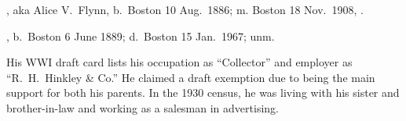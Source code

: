 \begin{Kids}
	, aka Alice V.\ Flynn, b.\ Boston 10 Aug.\ 1886; m. Boston 18 Nov.\ 1908, .
	
	, b.\ Boston 6 June 1889;\cite{Harry4FlynnBirth} d.\ Boston 15 Jan.\ 1967;\cite{Harry4FlynnDeath} unm.
	
	\begin{KidsMoreText}
		His WWI draft card lists his occupation as ``Collector'' and employer as ``R.\ H.\ Hinkley \& Co.'' He claimed a draft exemption due to being the main support for both his parents.\cite{Harry4FlynnDraft} In the 1930 census, he was living with his sister and brother-in-law and working as a salesman in advertising.\cite{Census1930HarryFlynn}
	\end{KidsMoreText}
	
\end{Kids}